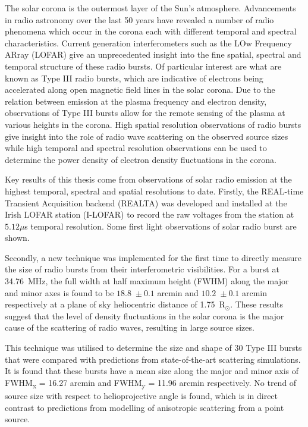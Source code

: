 \begin{abstracts} 
The solar corona is the outermost layer of the Sun's atmosphere. Advancements in radio astronomy over the last 50 years have revealed a number of radio phenomena which occur in the corona each with different temporal and spectral characteristics. Current generation interferometers such as the LOw Frequency ARray (LOFAR) give an unprecedented insight into the fine spatial, spectral and temporal structure of these radio bursts. Of particular interest are what are known as Type III radio bursts, which are indicative of electrons being accelerated along open magnetic field lines in the solar corona. Due to the relation between emission at the plasma frequency and electron density, observations of Type III bursts allow for the remote sensing of the plasma at various heights in the corona. High spatial resolution observations of radio bursts give insight into the role of radio wave scattering on the observed source sizes while high temporal and spectral resolution observations can be used to determine the power density of electron density fluctuations in the corona.

Key results of this thesis come from observations of solar radio emission at the highest temporal, spectral and spatial resolutions to date. Firstly, the REAL-time Transient Acquisition backend (REALTA) was developed and installed at the Irish LOFAR station (I-LOFAR) to record the raw voltages from the station at $5.12 \mu$s temporal resolution. Some first light observations of solar radio burst are shown.

Secondly, a new technique was implemented for the first time to directly measure the size of radio bursts from their interferometric visibilities. For a burst at 34.76~MHz, the full width at half maximum height (FWHM) along the major and minor axes is found to be $18.8$~$\pm~0.1$ arcmin and $10.2$~$\pm~0.1$ arcmin respectively at a plane of sky heliocentric distance of 1.75~R$_\odot$. These results suggest that the level of density fluctuations in the solar corona  is  the  major  cause  of  the  scattering  of  radio  waves, resulting in  large  source  sizes.

This technique was utilised to determine the size and shape of 30 Type III bursts that were compared with predictions from state-of-the-art scattering simulations. It is found that these bursts have a mean size along the major and minor axis of FWHM\textsubscript{x} = 16.27 arcmin and FWHM\textsubscript{y} = 11.96 arcmin respectively. No trend of source size with respect to helioprojective angle is found, which is in direct contrast to predictions from modelling of anisotropic scattering from a point source.


\end{abstracts}
